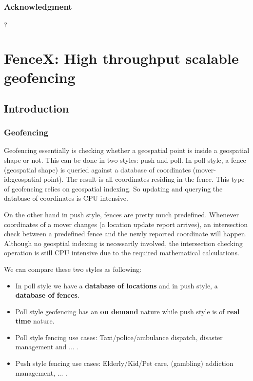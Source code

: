 \documentclass[a4]{report}
\begin{document}
    \section{Acknowledgment}
    ?

    \part[FenceX]{FenceX: High throughput scalable geofencing}

    \chapter{Introduction}

    \section{Geofencing}
    Geofencing essentially is checking whether a geospatial point is inside a geospatial shape or not.
    This can be done in two styles: push and poll.
    In poll style, a fence (geospatial shape) is queried against a database of coordinates (mover-id:geospatial point).
    The result is all coordinates residing in the fence.
    This type of geofencing relies on geospatial indexing.
    So updating and querying the database of coordinates is CPU intensive.

    On the other hand in push style, fences are pretty much predefined.
    Whenever coordinates of a mover changes (a location update report arrives), an intersection check between a
    predefined fence and the newly reported coordinate will happen.
    Although no geosptial indexing is necessarily involved, the intersection checking operation is still CPU
    intensive due to the required mathematical calculations.

    We can compare these two styles as following:
    \begin{itemize}
        \item In poll style we have a \textbf{database of locations} and in push style, a \textbf{database of fences}.
        \item Poll style geofencing has an \textbf{on demand} nature while push style is of \textbf{real time} nature.
        \item Poll style fencing use cases: Taxi/police/ambulance dispatch, disaster management and ... .
        \item Push style fencing use cases: Elderly/Kid/Pet care, (gambling) addiction management, ... .
    \end{itemize}
\end{document}
